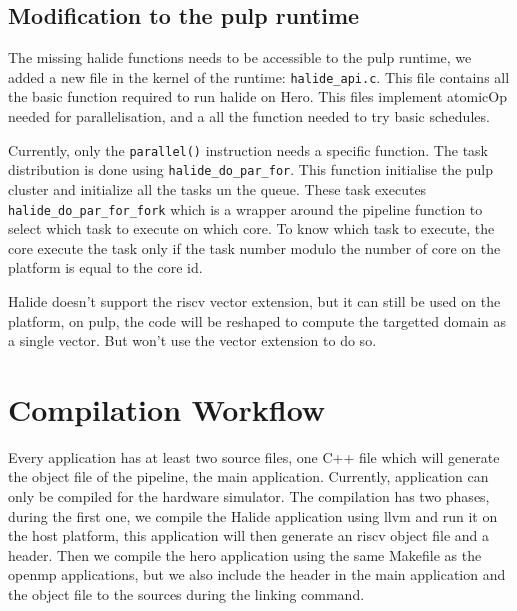 	\subsection{Modification to the \acrshort{pulp} runtime}
	The missing halide functions needs to be accessible to the pulp runtime, we added a new file in the kernel of the runtime: \texttt{halide\_api.c}. This file contains all the basic function required to run halide on Hero. This files implement \gls{atomicOp} needed for parallelisation, and a all the function needed to try basic schedules.

	Currently, only the \texttt{parallel()} instruction needs a specific function. The task distribution is done using \texttt{halide\_do\_par\_for}. This function initialise the \gls{pulp} cluster and initialize all the tasks un the queue. These task executes \texttt{halide\_do\_par\_for\_fork} which is a wrapper around the pipeline function to select which task to execute on which core. To know which task to execute, the core execute the task only if the task number modulo the number of core on the platform is equal to the core id.

	Halide doesn't support the \gls{riscv} vector extension, but it can still be used on the platform, on \gls{pulp}, the code will be reshaped to compute the targetted domain as a single vector. But won't use the vector extension to do so.


\section{Compilation Workflow}
	Every application has at least two source files, one C++ file which will generate the object file of the pipeline, the main application. 
	Currently, application can only be compiled for the hardware simulator.
	The compilation has two phases, during the first one, we compile the Halide application using \gls{llvm} and run it on the host platform, this application will then generate an \gls{riscv} object file and a header.
	Then we compile the hero application using the same Makefile as the \gls{openmp} applications, but we also include the header in the main application and the object file to the sources during the linking command.



